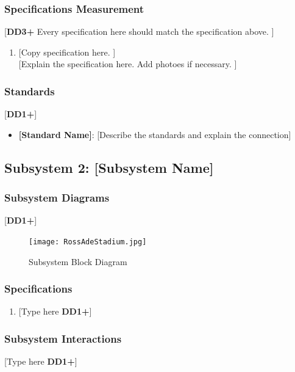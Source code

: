 \documentclass[letterpaper, 11pt]{article}
\begin{document}
\subsubsection{Specifications Measurement}
[\textbf{DD3+} Every specification here should match the specification above. ]
\begin{enumerate}
    \item {[Copy specification here. ]} \\
          {[Explain the specification here. Add photoes if necessary. ]}
\end{enumerate}

\subsubsection{Standards}
[\textbf{DD1+}]
\begin{itemize}
    \item \textbf{[Standard Name]}: [Describe the standards and explain the connection]
\end{itemize}

\clearpage
\subsection{Subsystem 2: [Subsystem Name]}

\subsubsection{Subsystem Diagrams}
[\textbf{DD1+}]
\begin{figure}[h]
    \centering
    \texttt{[image: RossAdeStadium.jpg]} %
    \caption{Subsystem Block Diagram}
\end{figure} %

\subsubsection{Specifications}
\begin{enumerate}
    \item {[Type here \textbf{DD1+}]}
\end{enumerate}

\subsubsection{Subsystem Interactions}
[Type here \textbf{DD1+}]
\end{document}
